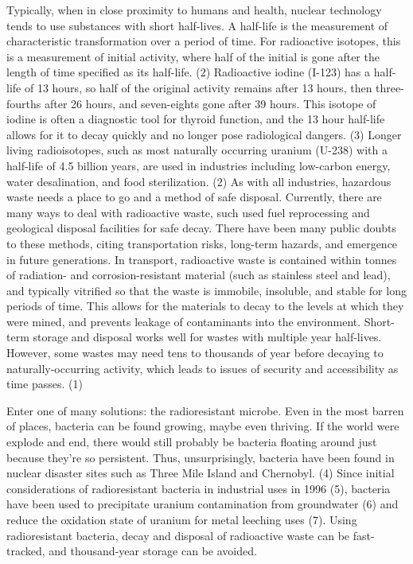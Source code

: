 \documentclass[12pt,twoside]{reedthesis}
\begin{document}
Typically, when in close proximity to humans and health, nuclear technology tends to use substances with short half-lives. A half-life is the measurement of characteristic transformation over a period of time. For radioactive isotopes, this is a measurement of initial activity, where half of the initial is gone after the length of time specified as its half-life. (2) Radioactive iodine (I-123) has a half-life of 13 hours, so half of the original activity remains after 13 hours, then three-fourths after 26 hours, and seven-eights gone after 39 hours. This isotope of iodine is often a diagnostic tool for thyroid function, and the 13 hour half-life allows for it to decay quickly and no longer pose radiological dangers. (3) Longer living radioisotopes, such as most naturally occurring uranium (U-238) with a half-life of 4.5 billion years, are used in industries including low-carbon energy, water desalination, and food sterilization. (2)
As with all industries, hazardous waste needs a place to go and a method of safe disposal. Currently, there are many ways to deal with radioactive waste, such used fuel reprocessing and geological disposal facilities for safe decay. There have been many public doubts to these methods, citing transportation risks, long-term hazards, and emergence in future generations. In transport, radioactive waste is contained within tonnes of radiation- and corrosion-resistant material (such as stainless steel and lead), and typically vitrified so that the waste is immobile, insoluble, and stable for long periods of time. This allows for the materials to decay to the levels at which they were mined, and prevents leakage of contaminants into the environment. Short-term storage and disposal works well for wastes with multiple year half-lives. However, some wastes may need tens to thousands of year before decaying to naturally-occurring activity, which leads to issues of security and accessibility as time passes. (1)

Enter one of many solutions: the radioresistant microbe. Even in the most barren of places, bacteria can be found growing, maybe even thriving. If the world were explode and end, there would still probably be bacteria floating around just because they're so persistent. Thus, unsurprisingly, bacteria have been found in nuclear disaster sites such as Three Mile Island and Chernobyl. (4) Since initial considerations of radioresistant bacteria in industrial uses in 1996 (5), bacteria have been used to precipitate uranium contamination from groundwater (6) and reduce the oxidation state of uranium for metal leeching uses (7). Using radioresistant bacteria, decay and disposal of radioactive waste can be fast-tracked, and thousand-year storage can be avoided.
\end{document}
